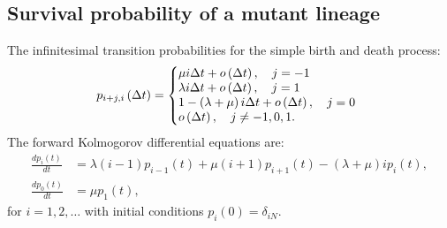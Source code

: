 \documentclass[12pt]{extarticle}
\begin{document}
\begin{appendices}
\renewcommand{\theequation}{\thesection\arabic{equation}}



\section{Survival probability of a mutant lineage}\label{AppendixSurvLin}
The infinitesimal transition probabilities for the simple birth and death process:
\begin{align*}
p_{i+j,i}\left(\Delta t\right)=\left\{
  \begin{array}{@{}ll@{}}
  \mu i\Delta t+o\left(\Delta t\right),\quad j=-1 \\
  \lambda i\Delta t+o\left(\Delta t\right),\quad j=1 \\
    1-\left(\lambda+\mu\right) i\Delta t+o\left(\Delta t\right),\quad j=0 \\
   o\left(\Delta t\right),\quad j\neq-1,0,1.
  \end{array}\right.
\end{align*}
The forward Kolmogorov differential equations are:
\begin{subequations}
\label{KolmeqSurv}
\begin{flalign}
\frac{dp_i\left(t\right)}{dt}&=\lambda\left(i-1\right)p_{i-1}\left(t\right)+\mu\left(i+1\right)p_{i+1}\left(t\right)-\left(\lambda+\mu\right)ip_i\left(t\right),\\
\frac{dp_0\left(t\right)}{dt}&=\mu p_1\left(t\right),
\end{flalign}
\end{subequations}
for $i=1,2,\dots$ with initial conditions $p_i\left(0\right)=\delta_{iN}$.


\end{appendices}
\end{document}
